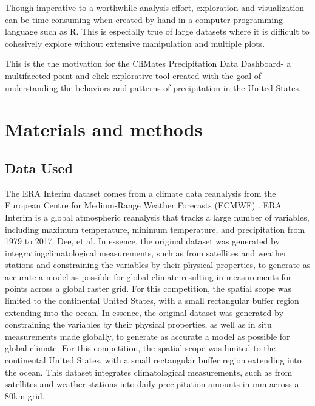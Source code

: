 \documentclass[10pt,letterpaper]{article}
\begin{document}
Though imperative to a worthwhile analysis effort, exploration and visualization can be time-consuming when created by hand in a computer programming language such as R. This is especially true of large datasets where it is difficult to cohesively explore without extensive manipulation and multiple plots.

This is the the motivation for the CliMates Precipitation Data Dashboard- a multifaceted point-and-click explorative tool created with the goal of understanding the behaviors and patterns of precipitation in the United States.



\section*{Materials and methods}

\subsection*{Data Used}

 The ERA Interim dataset comes from a climate data reanalysis from the European Centre for Medium-Range Weather Forecasts (ECMWF)\cite{era} . ERA Interim is a global atmospheric reanalysis that tracks a large number of variables, including maximum temperature, minimum temperature, and precipitation from 1979 to 2017. Dee, et al. In essence, the original dataset was generated by integratingclimatological measurements, such as from satellites and weather stations and constraining the variables by their physical properties, to generate as accurate a model as possible for global climate resulting in measurements for points across a global raster grid. For this competition, the spatial scope was limited to the continental United States, with a small rectangular buffer region extending into the ocean. In essence, the original dataset was generated by constraining the variables by their physical properties, as well as in situ measurements made globally, to generate as accurate a model as possible for global climate. For this competition, the spatial scope was limited to the continental United States, with a small rectangular buffer region extending into the ocean. This dataset integrates climatological measurements, such as from satellites and weather stations into daily precipitation amounts in mm across a 80km grid.
\end{document}
